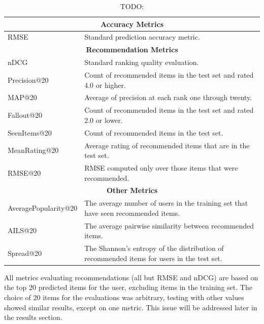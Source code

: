 \documentclass[letterpaper]{sig-alternate}
\begin{document}
  \begin{table}[ht!]
    \centering
    \begin{tabular}{|p{7em}|p{16em}|}
      \hline
      \multicolumn{2}{|c|}{{\bf Accuracy Metrics}} \\\hline
      RMSE                   & Standard prediction accuracy metric. \\\hline
      \hline
      \multicolumn{2}{|c|}{{\bf Recommendation Metrics}} \\\hline
      nDCG                   & Standard ranking quality evaluation.\\\hline
      Precision@20           & Count of recommended items in the test set and rated 4.0 or higher.\\\hline
      MAP@20                 & Average of precision at each rank one through twenty.\\\hline
      Fallout@20             & Count of recommended items in the test set and rated 2.0 or lower.\\\hline
      SeenItems@20           & Count of recommended items in the test set.\\\hline
      MeanRating@20          & Average rating of recommended items that are in the test set.\\\hline
      RMSE@20                & RMSE computed only over those items that were recommended.\\\hline
      \hline
      \multicolumn{2}{|c|}{{\bf Other Metrics}} \\\hline
      Average\-Popularity@20 & The average number of users in the training set that have seen recommended items.\\\hline
      AILS@20                & The average pairwise similarity between recommended items. \\\hline
      Spread@20              & The Shannon's entropy of the distribution of recommended items for users in the test set.\\\hline
    \end{tabular}
    \caption{TODO:}
    \label{tbl:metrics}
  \end{table}
  
  All metrics evaluating recommendations (all but RMSE and nDCG) are based on the top 20 predicted items for the user, excluding items in the training set.
  The choice of 20 items for the evaluations was arbitrary, testing with other values showed similar results, except on one metric.
  This issue will be addressed later in the results section.
  
\end{document}
